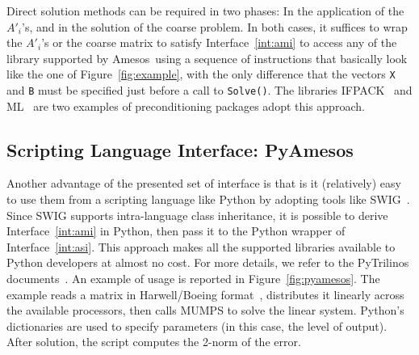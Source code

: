 \documentclass[acmtocl]{acmtrans2m}
\newcommand{\amesos}{{\sc Amesos}}
\begin{document}
Direct solution methods can be required in two phases: In the application of
the $A'_i$'s, and in the solution of the coarse problem. In both cases, it
suffices to wrap the $A'_i$'s or the coarse matrix to satisfy
Interface~\ref{int:ami} to access any of the library supported by \amesos\ using
a sequence of instructions that
basically look like the one of Figure~\ref{fig:example}, with the only
difference
that the vectors \verb!X! and \verb!B! must be specified just before a
call to \verb!Solve()!.  The libraries
IFPACK~\cite{ifpack-guide} and ML~\cite{ml-guide} are two examples of
preconditioning packages adopt this approach.

\subsection{Scripting Language Interface: PyAmesos}
\label{sec:pyamesos}

Another advantage of the presented set of interface is that is it (relatively)
  easy to use them from a scripting language like Python by adopting tools
  like SWIG~\cite{swig}. Since SWIG supports intra-language class inheritance,
  it is possible to derive Interface~\ref{int:ami} in Python, then pass it
  to the Python wrapper of Interface~\ref{int:asi}. This approach makes all the
  supported libraries available to Python developers at almost no cost. For
  more details, we refer to the PyTrilinos
  documents~\cite{sala05pytrilinos,pytrilinos-la-guide}. 
An example of usage is reported in Figure~\ref{fig:pyamesos}. The example
reads a matrix in Harwell/Boeing format~\cite{duff89sparse}, 
      distributes it linearly across the
available processors, then calls MUMPS to solve the linear system. Python's
dictionaries are used to specify parameters (in this case, the level of
                                             output). After solution, the
script computes the 2-norm of the error.
\end{document}
